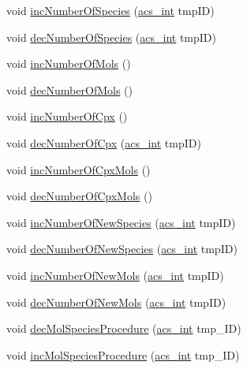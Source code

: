 \begin{DoxyCompactItemize}
\item 
void \hyperlink{a00013_a9fdf3a3b16809edd87c1b1963ef0a67f}{inc\+Number\+Of\+Species} (\hyperlink{a00050_a8d277355641a098190360234e2ebde35}{acs\+\_\+int} tmp\+I\+D)
\item 
void \hyperlink{a00013_a69a926e0b9bb4f4b29876d0e45b54d84}{dec\+Number\+Of\+Species} (\hyperlink{a00050_a8d277355641a098190360234e2ebde35}{acs\+\_\+int} tmp\+I\+D)
\item 
void \hyperlink{a00013_ae356db3b6ee374b998e9f041216b4b75}{inc\+Number\+Of\+Mols} ()
\item 
void \hyperlink{a00013_af042f7904c92fdd239995bebbab2cf60}{dec\+Number\+Of\+Mols} ()
\item 
void \hyperlink{a00013_a69ae530ef6f9298e3ab8304157709404}{inc\+Number\+Of\+Cpx} ()
\item 
void \hyperlink{a00013_aadd057e7038269e6fac314a12a3bf334}{dec\+Number\+Of\+Cpx} (\hyperlink{a00050_a8d277355641a098190360234e2ebde35}{acs\+\_\+int} tmp\+I\+D)
\item 
void \hyperlink{a00013_ab101d2158575829ddfe846087040f2fa}{inc\+Number\+Of\+Cpx\+Mols} ()
\item 
void \hyperlink{a00013_a756dc43b6b47498ba457613749324b15}{dec\+Number\+Of\+Cpx\+Mols} ()
\item 
void \hyperlink{a00013_a1055886a34a9a01ec37db31c69e460e0}{inc\+Number\+Of\+New\+Species} (\hyperlink{a00050_a8d277355641a098190360234e2ebde35}{acs\+\_\+int} tmp\+I\+D)
\item 
void \hyperlink{a00013_a5fa52a4f8e73a71fa41d3a1641e50535}{dec\+Number\+Of\+New\+Species} (\hyperlink{a00050_a8d277355641a098190360234e2ebde35}{acs\+\_\+int} tmp\+I\+D)
\item 
void \hyperlink{a00013_a1addb84f0c8d391f97ad2347a64208bb}{inc\+Number\+Of\+New\+Mols} (\hyperlink{a00050_a8d277355641a098190360234e2ebde35}{acs\+\_\+int} tmp\+I\+D)
\item 
void \hyperlink{a00013_ae9bbd78076706050ced4dd7fb99036f1}{dec\+Number\+Of\+New\+Mols} (\hyperlink{a00050_a8d277355641a098190360234e2ebde35}{acs\+\_\+int} tmp\+I\+D)
\item 
void \hyperlink{a00013_a10fad450cf5ef3a1c7cf75d616105069}{dec\+Mol\+Species\+Procedure} (\hyperlink{a00050_a8d277355641a098190360234e2ebde35}{acs\+\_\+int} tmp\+\_\+\+I\+D)
\item 
void \hyperlink{a00013_a7e0e11e36d7bcd6ef438c426aa8754a0}{inc\+Mol\+Species\+Procedure} (\hyperlink{a00050_a8d277355641a098190360234e2ebde35}{acs\+\_\+int} tmp\+\_\+\+I\+D)
\item 

\end{DoxyCompactItemize}

